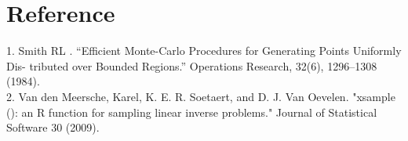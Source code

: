 \documentclass[11 pt, a4paper]{article}  %
\begin{document}
\newpage
\section*{Reference}
1. Smith RL . “Efficient Monte-Carlo Procedures for Generating Points Uniformly Dis- tributed over Bounded Regions.” Operations Research, 32(6), 1296–1308 (1984).\\ 
2. Van den Meersche, Karel, K. E. R. Soetaert, and D. J. Van Oevelen. "xsample (): an R function for sampling linear inverse problems." Journal of Statistical Software 30 (2009).
\end{document}

